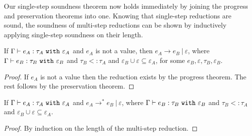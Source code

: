 Our single-step soundness theorem now holds immediately by joining the progress and preservation theorems into one. Knowing that single-step reductions are sound, the soundness of multi-step reductions can be shown by inductively applying single-step soundness on their length.

\begin{theorem}
If $ \Gamma \vdash  e_A:  \tau_A~\mathtt{with}~ \varepsilon_A$ and $ e_A$ is not a value, then $e_A \longrightarrow e_B~|~\varepsilon$, where $ \Gamma \vdash e_B:  \tau_B~\mathtt{with}~ \varepsilon_B$ and $ \tau_B <:  \tau_A$ and $\varepsilon_B \cup \varepsilon \subseteq \varepsilon_A$, for some $e_B, \varepsilon, \tau_B, \varepsilon_B$.
\end{theorem}
\begin{proof}
If $ e_A$ is not a value then the reduction exists by the progress theorem. The rest follows by the preservation theorem.
\end{proof}

\begin{theorem}
If $ \Gamma \vdash  e_A:  \tau_A~\mathtt{with}~ \varepsilon_A$ and $e_A \longrightarrow^{*} e_B~|~\varepsilon$, where $\Gamma \vdash e_B: \tau_B~\mathtt{with}~ \varepsilon_B$ and $ \tau_B <: \tau_A$ and $\varepsilon_B \cup \varepsilon \subseteq \varepsilon_A$.
\end{theorem}

\begin{proof} By induction on the length of the multi-step reduction.
\end{proof}








